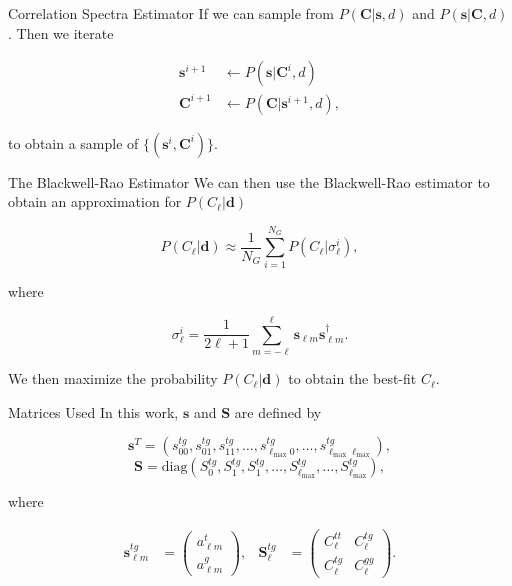 \documentclass[serif, aspectratio=169]{beamer}
\begin{document}
\begin{frame}{Correlation Spectra Estimator}
     If we can sample from $P(\mathbf{C}|\mathbf{s},d)$ and $P(\mathbf{s}|\mathbf{C},d)$. Then we iterate

    \begin{align}
        \mathbf{s}^{i+1}&\leftarrow P(\mathbf{s}|\mathbf{C}^i,d)\\
        \mathbf{C}^{i+1}&\leftarrow P(\mathbf{C}|\mathbf{s}^{i+1},d),
    \end{align}

    to obtain a sample of $\{(\mathbf{s}^i, \mathbf{C}^i)\}$.
\end{frame}

\begin{frame}{The Blackwell-Rao Estimator}
    We can then use the Blackwell-Rao estimator to obtain an approximation for $P(C_\ell|\mathbf{d})$

    \begin{equation}
        P(C_\ell|\mathbf{d})\approx \frac{1}{N_G}\sum_{i=1}^{N_G}P(C_\ell|\sigma_\ell^i),
    \end{equation}

    where

    \begin{equation}
        \sigma_\ell^i = \frac{1}{2\ell+1}\sum_{m=-\ell}^\ell \mathbf{s}_{\ell m}\mathbf{s}_{\ell m}^\dagger.
    \end{equation}

    We then maximize the probability $P(C_\ell|\mathbf{d})$ to obtain the best-fit $C_\ell$. 
\end{frame}

\begin{frame}{Matrices Used}
	In this work, $\mathbf{s}$ and $\mathbf{S}$ are defined by
	
	\begin{equation}\label{vec_s}
	\mathbf{s}^T=(s_{00}^{tg}, s_{01}^{tg}, s_{11}^{tg}, \dots, s_{\ell_\text{max}0}^{tg}, \dots, s_{\ell_\text{max} \ell_\text{max}}^{tg}),
\end{equation}
\begin{equation}\label{matrix_S}
	\mathbf{S}=\text{diag}(S_0^{tg}, S_1^{tg}, S_1^{tg},\dots, S_{\ell_\text{max}}^{tg}, \dots, S_{\ell_\text{max}}^{tg}),
\end{equation}

where 

\begin{align}\label{s_lm=}
	\mathbf{s}_{\ell m}^{tg}&=
	\begin{pmatrix}
	a_{\ell m}^t\\
	a_{\ell m}^g
	\end{pmatrix}, &
	\mathbf{S}_\ell^{tg}&=
	\begin{pmatrix}
	C_\ell^{tt} & C_\ell^{tg}\\
	C_\ell^{tg} & C_\ell^{gg}
	\end{pmatrix}.
\end{align}

\end{frame}
\end{document}
